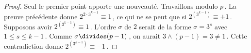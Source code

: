 \begin{proof}
	Seul le premier point apporte une nouveauté.
	Travaillons modulo $p$\,.
	La preuve précédente donne $2^{2 \cdot 3^{k-1}} \equiv 1$\,, ce qui ne se peut que si $2^{( 3^{k-1} )} \equiv \pm 1$\,.
	Supposons avoir $2^{( 3^{k-1} )} \equiv 1$\,.
	L'ordre $\sigma$ de $2$ serait de la forme $\sigma = 3^s$ avec $1 \leq s \leq k-1$\,.
	Comme $\sigma \divides (p-1)$\,, on aurait $3 \wedge (p-1) = 3 \neq 1$\,.
	Cette contradiction donne $2^{( 3^{k-1} )} \equiv -1$\,.
\end{proof}
